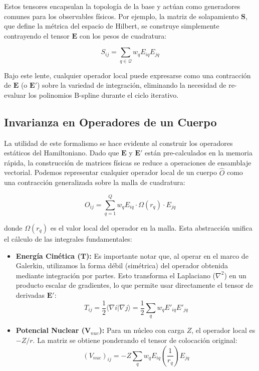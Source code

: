 \documentclass[12pt, a4paper, oneside, spanish]{article}
\begin{document}
Estos tensores encapsulan la topología de la base y actúan como generadores comunes para los observables físicos. Por ejemplo, la matriz de solapamiento \( \mathbf{S} \), que define la métrica del espacio de Hilbert, se construye simplemente contrayendo el tensor \( \bm{E} \) con los pesos de cuadratura:

\begin{equation}
S_{ij} = \sum_{q \in \mathcal{Q}} w_q E_{iq} E_{jq}
\end{equation}

Bajo este lente, cualquier operador local puede expresarse como una contracción de \( \bm{E} \) (o \( \bm{E}' \)) sobre la variedad de integración, eliminando la necesidad de re-evaluar los polinomios B-spline durante el ciclo iterativo.

\subsection{Invarianza en Operadores de un Cuerpo}

La utilidad de este formalismo se hace evidente al construir los operadores estáticos del Hamiltoniano. Dado que \( \bm{E} \) y \( \bm{E}' \) están pre-calculados en la memoria rápida, la construcción de matrices físicas se reduce a operaciones de ensamblaje vectorial. Podemos representar cualquier operador local de un cuerpo \( \hat{O} \) como una contracción generalizada sobre la malla de cuadratura:

\begin{equation}
O_{ij} = \sum_{q=1}^Q w_q E_{iq} \cdot \Omega(r_q) \cdot E_{jq}
\end{equation}

donde \( \Omega(r_q) \) es el valor local del operador en la malla. Esta abstracción unifica el cálculo de las integrales fundamentales:

\begin{itemize}
    \item \textbf{Energía Cinética (\( \mathbf{T} \)):}
    Es importante notar que, al operar en el marco de Galerkin, utilizamos la forma débil (simétrica) del operador obtenida mediante integración por partes. Esto transforma el Laplaciano (\( \nabla^2 \)) en un producto escalar de gradientes, lo que permite usar directamente el tensor de derivadas \( \bm{E}' \):
    \begin{equation}
    T_{ij} = \frac{1}{2} \langle \nabla i | \nabla j \rangle = \frac{1}{2} \sum_q w_q E'_{iq} E'_{jq}
    \end{equation}
    
    \item \textbf{Potencial Nuclear (\( \mathbf{V}_{nuc} \)):}
    Para un núcleo con carga \( Z \), el operador local es \( -Z/r \). La matriz se obtiene ponderando el tensor de colocación original:
    \begin{equation}
    (V_{nuc})_{ij} = -Z \sum_q w_q E_{iq} \left( \frac{1}{r_q} \right) E_{jq}
    \end{equation}
\end{itemize}
\end{document}
